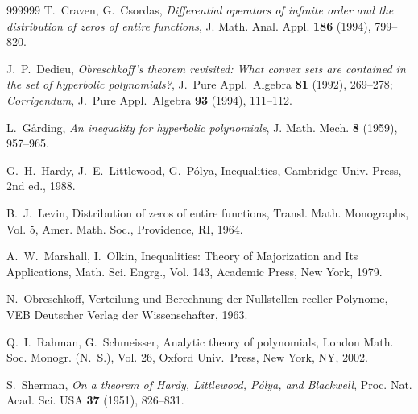 \documentclass[10pt,twoside,a4paper,reqno]{amsart}
\theoremstyle{plain}
\theoremstyle{definition}
\theoremstyle{remark}
\begin{document}
\begin{thebibliography}{999999}
T.~Craven, G.~Csordas, {\em Differential operators of infinite order and the 
distribution of zeros of entire functions}, J. Math. Anal. Appl. {\bf 186} 
(1994), 799--820.

J.~P.~Dedieu, {\em Obreschkoff's theorem revisited: What convex sets are 
contained in the set of hyperbolic polynomials?}, J.~Pure Appl.~Algebra 
{\bf 81} (1992), 269--278; {\em Corrigendum}, J.~Pure Appl.~Algebra {\bf 93} 
(1994), 111--112.

L.~G\aa rding, {\em An inequality for hyperbolic polynomials}, J. Math. 
Mech. {\bf 8} (1959), 957--965.

G.~H.~Hardy, J.~E.~Littlewood, G.~P\'olya, Inequalities, 
Cambridge Univ. Press, 2nd ed., 1988.

B.~J.~Levin, Distribution of zeros of entire functions, Transl.
Math. Monographs, Vol. 5, Amer. Math. Soc., Providence, RI, 1964.

A.~W.~Marshall, I.~Olkin, Inequalities: Theory of Majorization and 
Its Applications, Math. Sci. Engrg., Vol. 143, 
Academic Press, New York, 1979.

N.~Obreschkoff, Verteilung und Berechnung der Nullstellen reeller 
Polynome, VEB Deutscher Verlag der Wissenschafter, 1963.

Q.~I.~Rahman, G.~Schmeisser, Analytic theory of polynomials, London 
Math. Soc. Monogr. (N.~S.), Vol. 26, Oxford Univ.~Press, New York, 
NY, 2002.

S.~Sherman, {\em On a theorem of Hardy, Littlewood, P\'olya, and Blackwell}, 
Proc. Nat. Acad. Sci. USA {\bf 37} (1951), 826--831.

\end{thebibliography}
\end{document}
